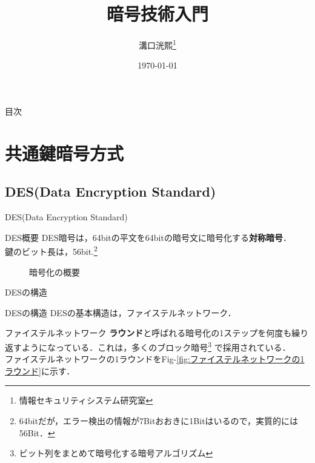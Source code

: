 \documentclass[dvipdfmx]{beamer}
\title[暗号技術入門]{暗号技術入門}
\author[K.MIZOGUCHI]{溝口洸熙\thanks{情報セキュリティシステム研究室}}
\date{\today}
\institute[KUT]{高知工科大学 情報学群}
\newcommand{\figref}[1]{Fig\thesection-\ref{#1}}
\begin{document}
\begin{frame}
\titlepage
\end{frame}
\begin{frame}{目次}
    \tableofcontents
\end{frame}

\section{共通鍵暗号方式}
\subsection{DES(Data Encryption Standard)}
\begin{frame}{DES(Data Encryption Standard)}
    \begin{block}{DES概要}
        DES暗号は，64bitの平文を64bitの暗号文に暗号化する\textbf{対称暗号}．\\
        鍵のビット長は，56bit.\footnote{64bitだが，エラー検出の情報が7Bitおおきに1Bitはいるので，実質的には56Bit．}
    \end{block}
    \begin{figure}[b]
        \centering
        \caption{暗号化の概要}
        \label{fig:暗号化の概要}
        
    \end{figure}
\end{frame}
\begin{frame}{DESの構造}
    \begin{block}{DESの構造}
        DESの基本構造は，ファイステルネットワーク．
    \end{block}
    \begin{block}{ファイステルネットワーク}
        \textbf{ラウンド}と呼ばれる暗号化の1ステップを何度も繰り返すようになっている．これは，多くのブロック暗号\footnote{ビット列をまとめて暗号化する暗号アルゴリズム} で採用されている．\\
        ファイステルネットワークの1ラウンドを\figref{fig:ファイステルネットワークの1ラウンド}に示す．
    \end{block}
\end{frame}
\end{document}
